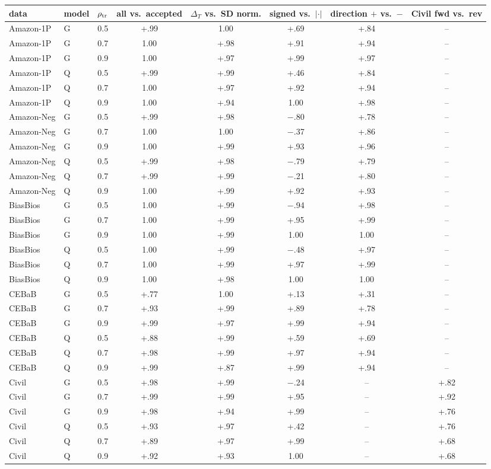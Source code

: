 \begin{tabular}{@{}lllccccc@{}}
\toprule
data & model & $\rho_{\text{tr}}$ & all vs.\ accepted & $\Delta_T$ vs.\ SD norm. & signed vs.\ $|\cdot|$ & direction $+$ vs.\ $-$ & Civil fwd vs.\ rev \\
\midrule
Amazon-1P & G & 0.5 & +.99 & 1.00 & +.69 & +.84 & -- \\
Amazon-1P & G & 0.7 & 1.00 & +.98 & +.91 & +.94 & -- \\
Amazon-1P & G & 0.9 & 1.00 & +.97 & +.99 & +.97 & -- \\
Amazon-1P & Q & 0.5 & +.99 & +.99 & +.46 & +.84 & -- \\
Amazon-1P & Q & 0.7 & 1.00 & +.97 & +.92 & +.94 & -- \\
Amazon-1P & Q & 0.9 & 1.00 & +.94 & 1.00 & +.98 & -- \\
Amazon-Neg & G & 0.5 & +.99 & +.98 & $-$.80 & +.78 & -- \\
Amazon-Neg & G & 0.7 & 1.00 & 1.00 & $-$.37 & +.86 & -- \\
Amazon-Neg & G & 0.9 & 1.00 & +.99 & +.93 & +.96 & -- \\
Amazon-Neg & Q & 0.5 & +.99 & +.98 & $-$.79 & +.79 & -- \\
Amazon-Neg & Q & 0.7 & +.99 & +.99 & $-$.21 & +.80 & -- \\
Amazon-Neg & Q & 0.9 & 1.00 & +.99 & +.92 & +.93 & -- \\
BiasBios & G & 0.5 & 1.00 & +.99 & $-$.94 & +.98 & -- \\
BiasBios & G & 0.7 & 1.00 & +.99 & +.95 & +.99 & -- \\
BiasBios & G & 0.9 & 1.00 & +.99 & 1.00 & 1.00 & -- \\
BiasBios & Q & 0.5 & 1.00 & +.99 & $-$.48 & +.97 & -- \\
BiasBios & Q & 0.7 & 1.00 & +.99 & +.97 & +.99 & -- \\
BiasBios & Q & 0.9 & 1.00 & +.98 & 1.00 & 1.00 & -- \\
CEBaB & G & 0.5 & +.77 & 1.00 & +.13 & +.31 & -- \\
CEBaB & G & 0.7 & +.93 & +.99 & +.89 & +.78 & -- \\
CEBaB & G & 0.9 & +.99 & +.97 & +.99 & +.94 & -- \\
CEBaB & Q & 0.5 & +.88 & +.99 & +.59 & +.69 & -- \\
CEBaB & Q & 0.7 & +.98 & +.99 & +.97 & +.94 & -- \\
CEBaB & Q & 0.9 & +.99 & +.87 & +.99 & +.94 & -- \\
Civil & G & 0.5 & +.98 & +.99 & $-$.24 & -- & +.82 \\
Civil & G & 0.7 & +.99 & +.99 & +.95 & -- & +.92 \\
Civil & G & 0.9 & +.98 & +.94 & +.99 & -- & +.76 \\
Civil & Q & 0.5 & +.93 & +.97 & +.42 & -- & +.76 \\
Civil & Q & 0.7 & +.89 & +.97 & +.99 & -- & +.68 \\
Civil & Q & 0.9 & +.92 & +.93 & 1.00 & -- & +.68 \\
\bottomrule
\end{tabular}
